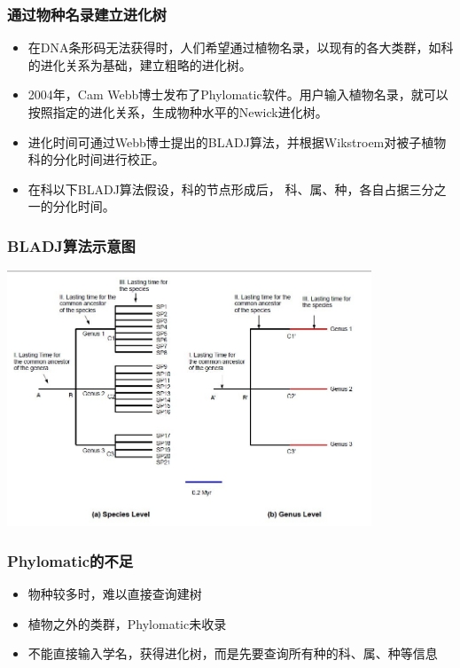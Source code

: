 \documentclass[UTF8]{ctexbeamer}
\begin{document}
    \begin{frame}
    \frametitle{通过物种名录建立进化树}
    \begin{itemize}
    \item 在DNA条形码无法获得时，人们希望通过植物名录，以现有的各大类群，如科的进化关系为基础，建立粗略的进化树。\\
    
    \item 2004年，Cam Webb博士发布了Phylomatic软件。用户输入植物名录，就可以按照指定的进化关系，生成物种水平的Newick进化树。\\ 
    
    \item 进化时间可通过Webb博士提出的BLADJ算法，并根据Wikstroem对被子植物科的分化时间进行校正。 \\
    
    \item 在科以下BLADJ算法假设，科的节点形成后， 科、属、种，各自占据三分之一的分化时间。 \\
    \end{itemize}
    
    \end{frame}
    
    \begin{frame}
    \frametitle{BLADJ算法示意图}
    \begin{center}
    \includegraphics[height=3in]{BLADJ.png}\\
    \end{center}
    \end{frame}
    
    \begin{frame}
    \frametitle{Phylomatic的不足}
    \begin{itemize}
    \item 物种较多时，难以直接查询建树
    \item 植物之外的类群，Phylomatic未收录
    \item 不能直接输入学名，获得进化树，而是先要查询所有种的科、属、种等信息
    \end{itemize}
    \end{frame}
    
\end{document}
